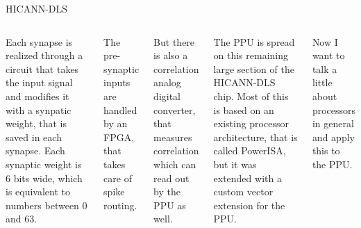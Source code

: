 \documentclass[10pt,aspectratio=169]{beamer}
\begin{document}
\begin{frame}{HICANN-DLS}
\begin{columns}[c]
{        Each synapse is realized through a circuit that takes the input signal and modifies it with a synpatic weight, that is saved in each synapse.
        Each synaptic weight is 6 bits wide, which is equivalent to numbers between 0 and 63.
        
        The pre-synaptic inputs are handled by an FPGA, that takes care of spike routing.
        
        But there is also a correlation analog digital converter, that measures correlation which can read out by the PPU as well. 

        The PPU is spread on this remaining large section of the HICANN-DLS chip.
		Most of this is based on an existing processor architecture, that is called PowerISA, but it was extended with a custom vector extension for the PPU.

		Now I want to talk a little about processors in general and apply this to the PPU.
}
    \end{columns}
\end{frame}
\end{document}
